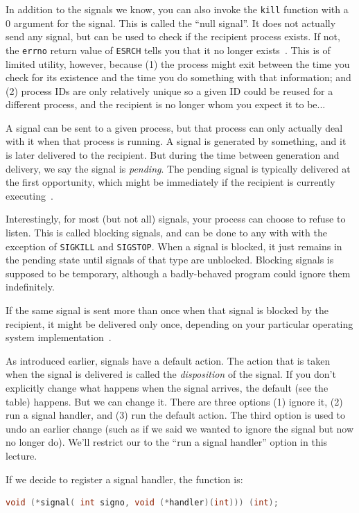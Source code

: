 \documentclass[a4paper]{report}
\begin{document}
In addition to the signals we know, you can also invoke the \texttt{kill} function with a 0 argument for the signal. This is called the ``null signal''. It does not actually send any signal, but can be used to check if the recipient process exists. If not, the \texttt{errno} return value of \texttt{ESRCH} tells you that it no longer exists~\cite{apunix}. This is of limited utility, however, because (1) the process might exit between the time you check for its existence and the time you do something with that information; and (2) process IDs are only relatively unique so a given ID could be reused for a different process, and the recipient is no longer whom you expect it to be...

A signal can be sent to a given process, but that process can only actually deal with it when that process is running. A signal is generated by something, and it is later delivered to the recipient. But during the time between generation and delivery, we say the signal is \textit{pending}. The pending signal is typically delivered at the first opportunity, which might be immediately if the recipient is currently executing~\cite{lpi}.

Interestingly, for most (but not all) signals, your process can choose to refuse to listen.  This is called blocking signals, and can be done to any with with the exception of \texttt{SIGKILL} and \texttt{SIGSTOP}. When a signal is blocked, it just remains in the pending state until signals of that type are unblocked. Blocking signals is supposed to be temporary, although a badly-behaved program could ignore them indefinitely.

If the same signal is sent more than once when that signal is blocked by the recipient, it might be delivered only once, depending on your particular operating system implementation~\cite{apunix}.

As introduced earlier, signals have a default action. The action that is taken when the signal is delivered is called the \textit{disposition} of the signal. If you don't explicitly change what happens when the signal arrives, the default (see the table) happens. But we can change it. There are three options (1) ignore it, (2) run a signal handler, and (3) run the default action. The third option is used to undo an earlier change (such as if we said we wanted to ignore the signal but now no longer do). We'll restrict our to the ``run a signal handler'' option in this lecture.

If we decide to register a signal handler, the function is:
\begin{lstlisting}[language=C]
void (*signal( int signo, void (*handler)(int))) (int);
\end{lstlisting}
\end{document}
